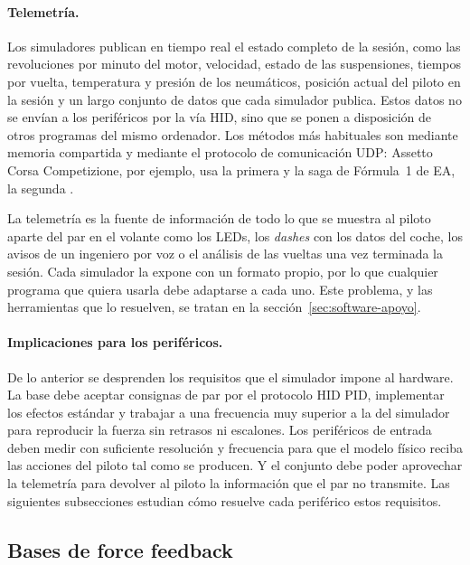 \paragraph{Telemetría.}
Los simuladores publican en tiempo real el estado completo de la sesión, como las revoluciones por minuto del motor, velocidad, estado de las suspensiones, tiempos por vuelta, temperatura y presión de los neumáticos, posición actual del piloto en la sesión y un largo conjunto de datos que cada simulador publica. Estos datos no se envían a los periféricos por la vía HID, sino que se ponen a disposición de otros programas del mismo ordenador. Los métodos más habituales son mediante memoria compartida y mediante el protocolo de comunicación UDP: Assetto Corsa Competizione, por ejemplo, usa la primera y la saga de Fórmula~1 de EA, la segunda \parencite{kunos_acc_shared_memory, ea_f1_25_udp}.

La telemetría es la fuente de información de todo lo que se muestra al piloto aparte del par en el volante como los LEDs, los \textit{dashes} con los datos del coche, los avisos de un ingeniero por voz o el análisis de las vueltas una vez terminada la sesión. Cada simulador la expone con un formato propio, por lo que cualquier programa que quiera usarla debe adaptarse a cada uno. Este problema, y las herramientas que lo resuelven, se tratan en la sección~\ref{sec:software-apoyo}.

\paragraph{Implicaciones para los periféricos.}
De lo anterior se desprenden los requisitos que el simulador impone al hardware. La base debe aceptar consignas de par por el protocolo HID PID, implementar los efectos estándar y trabajar a una frecuencia muy superior a la del simulador para reproducir la fuerza sin retrasos ni escalones. Los periféricos de entrada deben medir con suficiente resolución y frecuencia para que el modelo físico reciba las acciones del piloto tal como se producen. Y el conjunto debe poder aprovechar la telemetría para devolver al piloto la información que el par no transmite. Las siguientes subsecciones estudian cómo resuelve cada periférico estos requisitos.

\subsection{Bases de force feedback}
\label{sec:bases-ffb}

